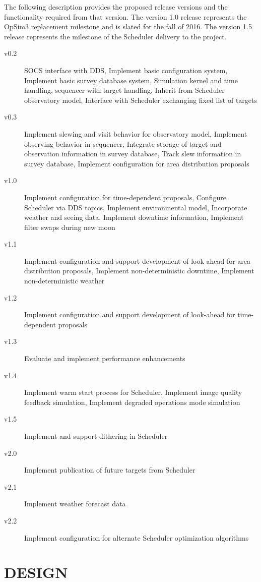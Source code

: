 \documentclass[]{spie}  %
\begin{document}
The following description provides the proposed release versions and the functionality required from that version. The version 1.0 release represents the OpSim3 replacement milestone and is slated for the fall of 2016. The version 1.5 release represents the milestone of the Scheduler delivery to the project.

\begin{description}
	\item[v0.2] SOCS interface with DDS, Implement basic configuration system, Implement basic survey database system, Simulation kernel and time handling, sequencer with target handling, Inherit from Scheduler observatory model, Interface with Scheduler exchanging fixed list of targets
	\item[v0.3] Implement slewing and visit behavior for observatory model, Implement observing behavior in sequencer, Integrate storage of target and observation information in survey database, Track slew information in survey database, Implement configuration for area distribution proposals
	\item[v1.0] Implement configuration for time-dependent proposals, Configure Scheduler via DDS topics, Implement environmental model, Incorporate weather and seeing data, Implement downtime information, Implement filter swaps during new moon
	\item[v1.1] Implement configuration and support development of look-ahead for area distribution proposals, Implement non-deterministic downtime, Implement non-deterministic weather
	\item[v1.2] Implement configuration and support development of look-ahead for time-dependent proposals
	\item[v1.3] Evaluate and implement performance enhancements
	\item[v1.4] Implement warm start process for Scheduler, Implement image quality feedback simulation, Implement degraded operations mode simulation
	\item[v1.5] Implement and support dithering in Scheduler
	\item[v2.0] Implement publication of future targets from Scheduler
	\item[v2.1] Implement weather forecast data
	\item[v2.2] Implement configuration for alternate Scheduler optimization algorithms
\end{description}

\section{DESIGN}
\end{document}
